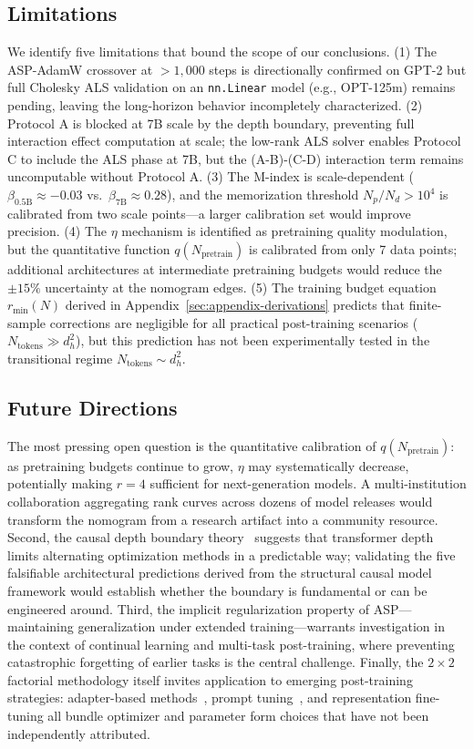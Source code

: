 \documentclass[11pt]{article}
\begin{document}
\subsection{Limitations}

We identify five limitations that bound the scope of our conclusions. (1) The ASP-AdamW crossover at $>1,000$ steps is directionally confirmed on GPT-2 but full Cholesky ALS validation on an \texttt{nn.Linear} model (e.g., OPT-125m) remains pending, leaving the long-horizon behavior incompletely characterized. (2) Protocol A is blocked at 7B scale by the depth boundary, preventing full interaction effect computation at scale; the low-rank ALS solver enables Protocol C to include the ALS phase at 7B, but the (A-B)-(C-D) interaction term remains uncomputable without Protocol A. (3) The M-index is scale-dependent ($\beta_{0.5\text{B}} \approx -0.03$ vs.\ $\beta_{7\text{B}} \approx 0.28$), and the memorization threshold $N_p/N_d > 10^4$ is calibrated from two scale points---a larger calibration set would improve precision. (4) The $\eta$ mechanism is identified as pretraining quality modulation, but the quantitative function $q(N_{\text{pretrain}})$ is calibrated from only 7 data points; additional architectures at intermediate pretraining budgets would reduce the $\pm 15\%$ uncertainty at the nomogram edges. (5) The training budget equation $r_{\min}(N)$ derived in Appendix~\ref{sec:appendix-derivations} predicts that finite-sample corrections are negligible for all practical post-training scenarios ($N_{\text{tokens}} \gg d_h^2$), but this prediction has not been experimentally tested in the transitional regime $N_{\text{tokens}} \sim d_h^2$.

\subsection{Future Directions}

The most pressing open question is the quantitative calibration of $q(N_{\text{pretrain}})$: as pretraining budgets continue to grow, $\eta$ may systematically decrease, potentially making $r=4$ sufficient for next-generation models. A multi-institution collaboration aggregating rank curves across dozens of model releases would transform the nomogram from a research artifact into a community resource. Second, the causal depth boundary theory~\cite{noci2022signal} suggests that transformer depth limits alternating optimization methods in a predictable way; validating the five falsifiable architectural predictions derived from the structural causal model framework would establish whether the boundary is fundamental or can be engineered around. Third, the implicit regularization property of ASP---maintaining generalization under extended training---warrants investigation in the context of continual learning and multi-task post-training, where preventing catastrophic forgetting of earlier tasks is the central challenge. Finally, the $2\times 2$ factorial methodology itself invites application to emerging post-training strategies: adapter-based methods~\cite{houlsby2019parameter}, prompt tuning~\cite{lester2021power}, and representation fine-tuning all bundle optimizer and parameter form choices that have not been independently attributed.
\end{document}

